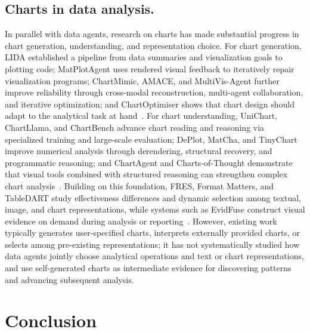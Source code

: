 \documentclass{article}
\begin{document}
\subsection{Charts in data analysis.}
In parallel with data agents, research on charts has made substantial progress in chart generation, understanding, and representation choice.
For chart generation, LIDA established a pipeline from data summaries and visualization goals to plotting code; MatPlotAgent uses rendered visual feedback to iteratively repair visualization programs; ChartMimic, AMACE, and MultiVis-Agent further improve reliability through cross-modal reconstruction, multi-agent collaboration, and iterative optimization; and ChartOptimiser shows that chart design should adapt to the analytical task at hand~\citep{dibia2023lida,yang2024matplotagent,yang2025chartmimic,namgoong2025amace,lu2026multivisagent,wang2025chartoptimiser}.
For chart understanding, UniChart, ChartLlama, and ChartBench advance chart reading and reasoning via specialized training and large-scale evaluation; DePlot, MatCha, and TinyChart improve numerical analysis through derendering, structural recovery, and programmatic reasoning; and ChartAgent and Charts-of-Thought demonstrate that visual tools combined with structured reasoning can strengthen complex chart analysis~\citep{masry2023unichart,han2023chartllama,xu2023chartbench,liu2023deplot,liu2023matcha,zhang2024tinychart,kaur2026chartagent,das2025chartsofthought}.
Building on this foundation, FRES, Format Matters, and TableDART study effectiveness differences and dynamic selection among textual, image, and chart representations, while systems such as EvidFuse construct visual evidence on demand during analysis or reporting~\citep{zhou2025fres,ho2026formatmatters,xing2026tabledart,lin2026evidfuse}.
However, existing work typically generates user-specified charts, interprets externally provided charts, or selects among pre-existing representations; it has not systematically studied how data agents jointly choose analytical operations and text or chart representations, and use self-generated charts as intermediate evidence for discovering patterns and advancing subsequent analysis.

\section{Conclusion}
\label{sec:conclusion}
\end{document}
